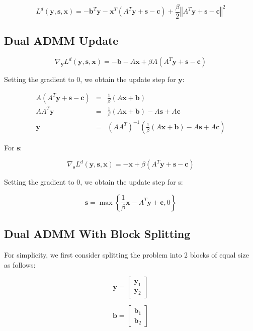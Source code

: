\documentclass{article}
\begin{document}
\[
L^{d}(\mathbf{y},\mathbf{s},\mathbf{x})=-\mathbf{b}^{T}\mathbf{y}-\mathbf{x}^{T}\left(A^{T}\mathbf{y}+\mathbf{s}-\mathbf{c}\right)+\frac{\beta}{2}\left\Vert A^{T}\mathbf{y}+\mathbf{s}-\mathbf{c}\right\Vert ^{2}
\]



\subsection*{Dual ADMM Update}

\[
\nabla_{\mathbf{y}}L^{d}(\mathbf{y},\mathbf{s},\mathbf{x})=-\mathbf{b}-A\mathbf{x}+\beta A\left(A^{T}\mathbf{y}+\mathbf{s}-\mathbf{c}\right)
\]


Setting the gradient to $0$, we obtain the update step for $\mathbf{y}$:

\begin{eqnarray*}
A\left(A^{T}\mathbf{y}+\mathbf{s}-\mathbf{c}\right) & = & \frac{1}{\beta}\left(A\mathbf{x}+\mathbf{b}\right)\\
AA^{T}\mathbf{y} & = & \frac{1}{\beta}\left(A\mathbf{x}+\mathbf{b}\right)-A\mathbf{s}+A\mathbf{c}\\
\mathbf{y} & = & \left(AA^{T}\right)^{-1}\left(\frac{1}{\beta}\left(A\mathbf{x}+\mathbf{b}\right)-A\mathbf{s}+A\mathbf{c}\right)
\end{eqnarray*}


For \textbf{$\mathbf{s}$}:

\[
\nabla_{\mathbf{s}}L^{d}(\mathbf{y},\mathbf{s},\mathbf{x})=-\mathbf{x}+\beta\left(A^{T}\mathbf{y}+\mathbf{s}-\mathbf{c}\right)
\]


Setting the gradient to $0$, we obtain the update step for s:

\[
\mathbf{s}=\max\left\{ \frac{1}{\beta}\mathbf{x}-A^{T}\mathbf{y}+\mathbf{c},0\right\} 
\]



\subsection*{Dual ADMM With Block Splitting}

For simplicity, we first consider splitting the problem into 2 blocks
of equal size as follows:

\[
\mathbf{y}=\begin{bmatrix}\mathbf{y}_{1}\\
\mathbf{y}_{2}
\end{bmatrix}
\]


\[
\mathbf{b}=\begin{bmatrix}\mathbf{b}_{1}\\
\mathbf{b}_{2}
\end{bmatrix}
\]
\end{document}
